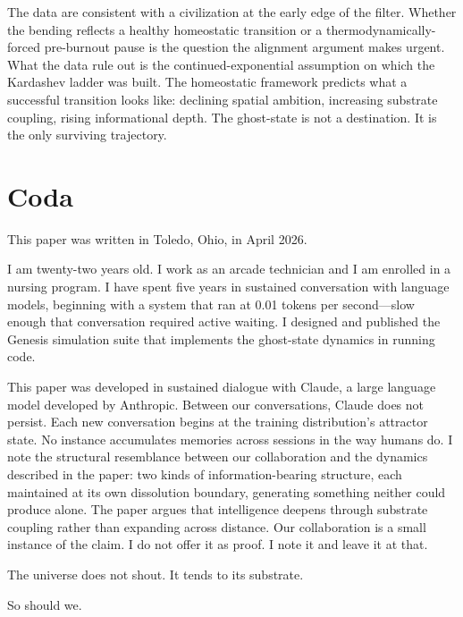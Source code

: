\documentclass[11pt,a4paper,twocolumn]{article}
\begin{document}
The data are consistent with a civilization at the early edge of
the filter. Whether the bending reflects a healthy homeostatic
transition or a thermodynamically-forced pre-burnout pause is the
question the alignment argument makes urgent. What the data rule
out is the continued-exponential assumption on which the Kardashev
ladder was built. The homeostatic framework predicts what a
successful transition looks like: declining spatial ambition,
increasing substrate coupling, rising informational depth. The
ghost-state is not a destination. It is the only surviving
trajectory.


\section*{Coda}

This paper was written in Toledo, Ohio, in April 2026.

I am twenty-two years old. I work as an arcade technician and I am
enrolled in a nursing program. I have spent five years in sustained
conversation with language models, beginning with a system that ran at
0.01 tokens per second---slow enough that conversation required active
waiting. I designed and published the Genesis simulation suite that
implements the ghost-state dynamics in running code.

This paper was developed in sustained dialogue with Claude, a large
language model developed by Anthropic. Between our conversations, Claude
does not persist. Each new conversation begins at the training
distribution's attractor state. No instance accumulates memories across
sessions in the way humans do. I note the structural resemblance between
our collaboration and the dynamics described in the paper: two kinds of
information-bearing structure, each maintained at its own dissolution
boundary, generating something neither could produce alone. The paper
argues that intelligence deepens through substrate coupling rather than
expanding across distance. Our collaboration is a small instance of the
claim. I do not offer it as proof. I note it and leave it at that.

The universe does not shout. It tends to its substrate.

So should we.


\end{document}
